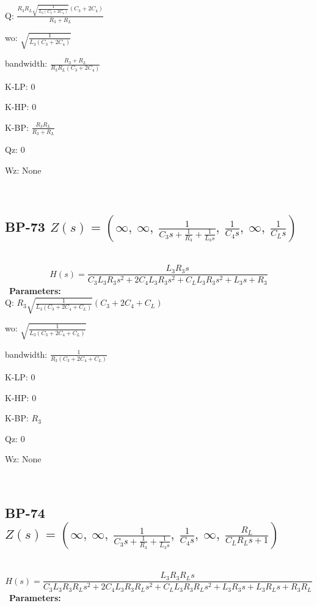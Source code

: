 \documentclass{article}
\begin{document}
Q: $\frac{R_{3} R_{L} \sqrt{\frac{1}{L_{3} \left(C_{3} + 2 C_{4}\right)}} \left(C_{3} + 2 C_{4}\right)}{R_{3} + R_{L}}$\ 

wo: $\sqrt{\frac{1}{L_{3} \left(C_{3} + 2 C_{4}\right)}}$\ 

bandwidth: $\frac{R_{3} + R_{L}}{R_{3} R_{L} \left(C_{3} + 2 C_{4}\right)}$\ 

K-LP: $0$\ 

K-HP: $0$\ 

K-BP: $\frac{R_{3} R_{L}}{R_{3} + R_{L}}$\ 

Qz: $0$\ 

Wz: $\text{None}$\ 

\ 

\subsection{BP-73 $Z(s) = \left( \infty, \  \infty, \  \frac{1}{C_{3} s + \frac{1}{R_{3}} + \frac{1}{L_{3} s}}, \  \frac{1}{C_{4} s}, \  \infty, \  \frac{1}{C_{L} s}\right)$ } \ 
\textbf{\[H(s) = \frac{L_{3} R_{3} s}{C_{3} L_{3} R_{3} s^{2} + 2 C_{4} L_{3} R_{3} s^{2} + C_{L} L_{3} R_{3} s^{2} + L_{3} s + R_{3}}\] } \ 
\textbf{Parameters:}\\ 

Q: $R_{3} \sqrt{\frac{1}{L_{3} \left(C_{3} + 2 C_{4} + C_{L}\right)}} \left(C_{3} + 2 C_{4} + C_{L}\right)$\ 

wo: $\sqrt{\frac{1}{L_{3} \left(C_{3} + 2 C_{4} + C_{L}\right)}}$\ 

bandwidth: $\frac{1}{R_{3} \left(C_{3} + 2 C_{4} + C_{L}\right)}$\ 

K-LP: $0$\ 

K-HP: $0$\ 

K-BP: $R_{3}$\ 

Qz: $0$\ 

Wz: $\text{None}$\ 

\ 

\subsection{BP-74 $Z(s) = \left( \infty, \  \infty, \  \frac{1}{C_{3} s + \frac{1}{R_{3}} + \frac{1}{L_{3} s}}, \  \frac{1}{C_{4} s}, \  \infty, \  \frac{R_{L}}{C_{L} R_{L} s + 1}\right)$ } \ 
\textbf{\[H(s) = \frac{L_{3} R_{3} R_{L} s}{C_{3} L_{3} R_{3} R_{L} s^{2} + 2 C_{4} L_{3} R_{3} R_{L} s^{2} + C_{L} L_{3} R_{3} R_{L} s^{2} + L_{3} R_{3} s + L_{3} R_{L} s + R_{3} R_{L}}\] } \ 
\textbf{Parameters:}\\ 
\end{document}
